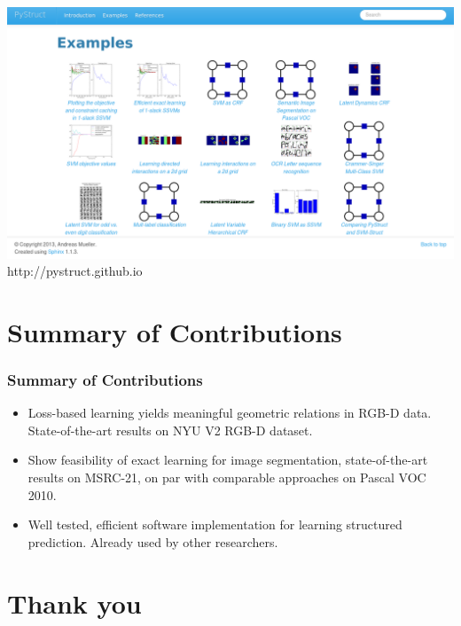 \documentclass[final,ignorenonframetext,compress]{beamer}
\begin{document}
    \begin{frame}
        \begin{center}
            \includegraphics[width=\linewidth]{images/example_gallery}\\
            http://pystruct.github.io
        \end{center}
    \end{frame}


\section*{Summary of Contributions}
\begin{frame}
    \frametitle{Summary of Contributions}
    \begin{itemize}
        \item<1-> Loss-based learning yields meaningful geometric relations in RGB-D data. State-of-the-art results on NYU V2 RGB-D dataset.
        \item<2-> Show feasibility of exact learning for image segmentation, state-of-the-art results on MSRC-21, on par with comparable approaches on Pascal VOC 2010.
        \item<3-> Well tested, efficient software implementation for learning structured prediction. Already used by other researchers.
    \end{itemize}
\end{frame}

\section*{Thank you}
\end{document}
